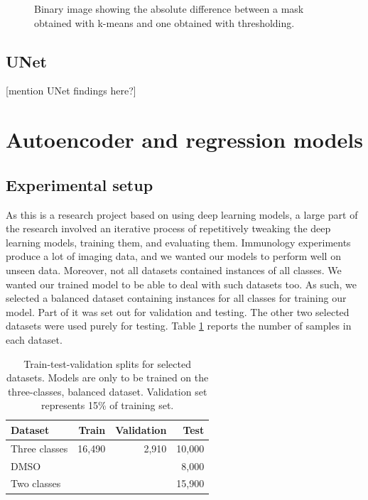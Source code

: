\begin{figure}[h]
    \centering
    \caption{Binary image showing the absolute difference between a mask obtained with k-means and one obtained with thresholding.}
    \label{fig:maskdiff}
\end{figure}

\subsection{UNet}

[mention UNet findings here?]

\section{Autoencoder and regression models}

\subsection{Experimental setup}

As this is a research project based on using deep learning models, a large part of the research involved an iterative process of repetitively tweaking the deep learning models, training them, and evaluating them. Immunology experiments produce a lot of imaging data, and we wanted our models to perform well on unseen data. Moreover, not all datasets contained instances of all classes. We wanted our trained model to be able to deal with such datasets too. As such, we selected a balanced dataset containing instances for all classes for training our model. Part of it was set out for validation and testing. The other two selected datasets were used purely for testing. Table \ref{table:splits} reports the number of samples in each dataset.

\begin{table}[h]
\centering
\begin{tabular}{l|r|r|r}
\rowcolor[HTML]{EFEFEF}
Dataset       & Train  & Validation & Test   \\ \hline
Three classes & 16,490 & 2,910      & 10,000 \\
DMSO          &        &            & 8,000  \\
Two classes   &        &            & 15,900
\end{tabular}
\caption{Train-test-validation splits for selected datasets. Models are only to be trained on the three-classes, balanced dataset. Validation set represents 15\% of training set.}
\label{table:splits}
\end{table}

